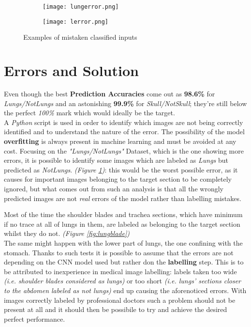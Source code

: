 \documentclass[../main.tex]{subfiles}
\begin{document}
\begin{figure}[H]
   \centering
    \begin{subfigure}{0.4\linewidth}
        \texttt{[image: lungerror.png]}
    \end{subfigure}
    \begin{subfigure}{0.4\linewidth}
        \texttt{[image: lerror.png]}
    \end{subfigure}
   
  \caption{Examples of mistaken classified inputs}
  \label{fig:err}
\end{figure}

\section{Errors and Solution}
Even though the best \textbf{Prediction Accuracies} come out as \textbf{98.6\%} for \textit{Lungs/NotLungs} and an astonishing \textbf{99.9\%} for \textit{Skull/NotSkull}; they're still below the perfect \textit{100\%} mark which would ideally be the target. \\
A \textit{Python} script is used in order to identify which images are not being correctly identified and to understand the nature of the error. The possibility of the model \textbf{overfitting} is always present in machine learning and must be avoided at any cost. 
Focusing on the \textit{"Lungs/NotLungs"} Dataset, which is the one showing more errors, it is possible to identify some images which are labeled as \textit{Lungs} but predicted as \textit{NotLungs}. \textit{(Figure \ref{fig:err})}: this would be the worst possible error, as it causes for important images belonging to the target section to be completely ignored, but what comes out from such an analysis is that all the wrongly predicted images are not \textit{real} errors of the model rather than labelling mistakes. \\
\clearpage
\newpage

Most of the time the shoulder blades and trachea sections, which have minimum if no trace at all of lungs in them, are labeled as belonging to the target section whilst they do not. \textit{(Figure \ref{fig:lungblade})} \\
The same might happen with the lower part of lungs, the one confining with the stomach. Thanks to such tests it is possible to assume that the errors are not depending on the CNN model used but rather don the \textbf{labelling} step. This is to be attributed to inexperience in medical image labelling: labels taken too wide \textit{(i.e. shoulder blades considered as lungs)} or too short \textit{(i.e. lungs' sections closer to the abdomen labeled as not lungs)} end up causing the aforenoticed errors. With images correctly labeled by professional doctors such a problem should not be present at all and it should then be possibile to try and achieve the desired perfect performance.
\end{document}
